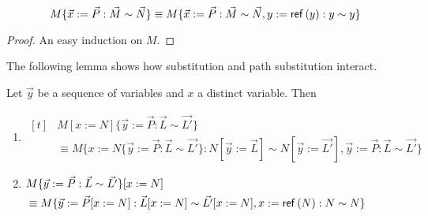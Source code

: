 {\begin{code}
\\
\>\AgdaSymbol{(} \AgdaSymbol{)}  \AgdaSymbol{=} \<%
\\
\>\AgdaSymbol{(} \AgdaSymbol{)} \AgdaSymbol{(} \AgdaSymbol{)} \AgdaSymbol{=}  \AgdaSymbol{(} \AgdaSymbol{)}\<%
\end{code}
}


\begin{lm}
\[ M \{ \vec{x} := \vec{P} : \vec{M} \sim \vec{N} \} \equiv M \{ \vec{x} := \vec{P} : \vec{M} \sim \vec{N}, y := \mathsf{ref} \left( {y} \right) : y \sim y \} \]
\end{lm}

\begin{proof}
An easy induction on $M$.
\end{proof}

The following lemma shows how substitution and path substitution interact.

\begin{lm}
\label{lm:subpathsub}
Let $\vec{y}$ be a sequence of variables and $x$ a distinct variable.  Then
\begin{enumerate}
\item
\label{lm:subpathsubi}
$ \begin{aligned}[t]
& M [ x:= N ] \{ \vec{y} := \vec{P} : \vec{L} \sim \vec{L'} \} \\
& \equiv M \{ x := N \{ \vec{y} := \vec{P} : \vec{L} \sim \vec{L'} \} : N [ \vec{y}:= \vec{L} ] \sim N [ \vec{y} := \vec{L'} ], \vec{y} := \vec{P} : \vec{L} \sim \vec{L'} \}
\end{aligned} $
\item
\label{lm:subpathsubii}
$ \begin{aligned}[t]
& M \{ \vec{y} := \vec{P} : \vec{L} \sim \vec{L'} \} [ x := N ] \\
& \equiv M \{ \vec{y} := \vec{P} [x := N] : \vec{L} [x := N] \sim \vec{L'} [x := N], x := \mathsf{ref} \left( {N} \right) : N \sim N \}
\end{aligned} $
\end{enumerate}
\end{lm}

